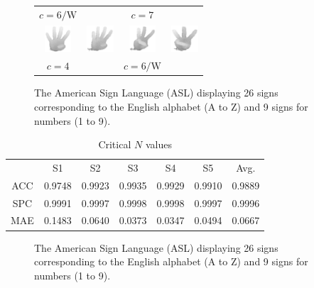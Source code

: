 \documentclass[a4paper]{article}
\begin{document}
\begin{figure}
\begin{tabular}{cccc}
$c=\text{6/W}$ & & $c=\text{7}$ \\
\includegraphics[width=1cm]{img/S01_C04m_0185.eps} & 
\includegraphics[width=1cm]{img/S01_C04_0118.eps} & 
\includegraphics[width=1cm]{img/S01_C06_0014.eps} & 
\includegraphics[width=1cm]{img/S01_C06m_0167.eps} \\ 
$c=\text{4}$ & & $c=\text{6/W}$ \\
\end{tabular}
\caption{The American Sign Language (ASL) displaying 26 signs corresponding to the
English alphabet (A to Z) and 9 signs for numbers (1 to 9).}
\label{fig:errors}
\end{figure}


\begin{table}
\centering
\caption{Critical $N$ values}
\begin{tabular}{ccccccc}
\hline\noalign{\smallskip}
 & S1 & S2 & S3 & S4 & S5 & Avg. \\ \noalign{\smallskip}
\hline
\noalign{\smallskip}
ACC & 0.9748 & 0.9923 & 0.9935 & 0.9929 & 0.9910 & 0.9889 \\ 
SPC & 0.9991 & 0.9997 & 0.9998 & 0.9998 & 0.9997 & 0.9996 \\
MAE & 0.1483 & 0.0640 & 0.0373 & 0.0347 & 0.0494 & 0.0667\\ \hline
\end{tabular}
\end{table}

\begin{figure}
\centering
{}
\caption{The American Sign Language (ASL) displaying 26 signs corresponding to the
English alphabet (A to Z) and 9 signs for numbers (1 to 9).}
\label{fig:errPerClass}
\end{figure}
\end{document}
